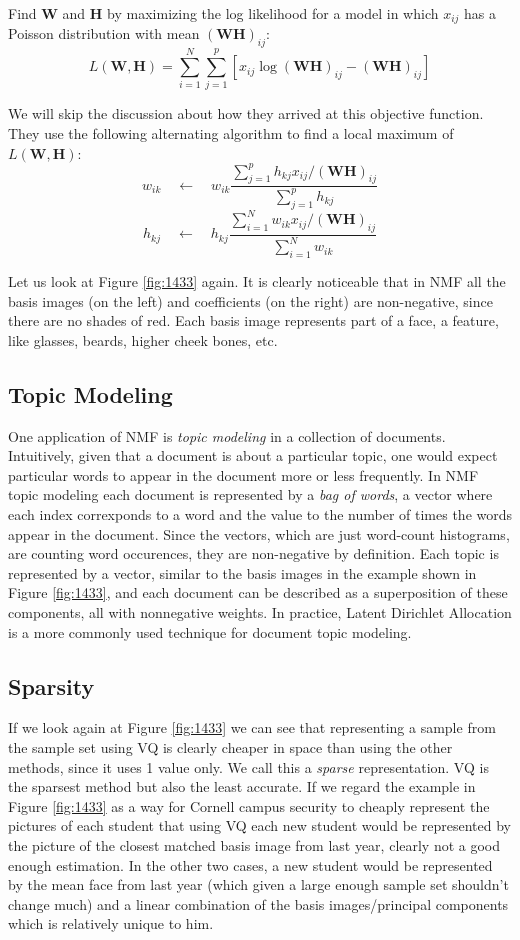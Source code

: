\documentclass[a4paper]{article}
\begin{document}
Find $\mathbf{W}$ and $\mathbf{H}$ by maximizing the log likelihood for a model in which $x_{ij}$ has a Poisson distribution with mean $\left(\mathbf{WH}\right)_{ij}$:
$$L(\mathbf{W},\mathbf{H})=\sum_{i=1}^N \sum_{j=1}^p \left[ x_{ij}\log\left(\mathbf{WH}\right)_{ij}-\left(\mathbf{WH}\right)_{ij}\right]$$

We will skip the discussion about how they arrived at this objective function. They use the following alternating algorithm to find a local maximum of $L(\mathbf{W},\mathbf{H})$:
$$w_{ik} \quad\leftarrow\quad w_{ik} \frac{\sum\limits_{j=1}^p h_{kj}x_{ij}/\left(\mathbf{WH}\right)_{ij}}{\sum\limits_{j=1}^p h_{kj}}$$
$$h_{kj} \quad\leftarrow\quad h_{kj} \frac{\sum\limits_{i=1}^N w_{ik}x_{ij}/\left(\mathbf{WH}\right)_{ij}}{\sum\limits_{i=1}^N w_{ik}}$$

Let us look at Figure \ref{fig:1433} again. It is clearly noticeable that in NMF all the basis images (on the left) and coefficients (on the right) are non-negative, since there are no shades of red. Each basis image represents part of a face, a feature, like glasses, beards, higher cheek bones, etc.\\

\subsection{Topic Modeling}
One application of NMF is \textit{topic modeling} in a collection of documents. Intuitively, given that a document is about a particular topic, one would expect particular words to appear in the document more or less frequently. In NMF topic modeling each document is represented by a \textit{bag of words}, a vector where each index correxponds to a word and the value to the number of times the words appear in the document. Since the vectors, which are just word-count histograms, are counting word occurences, they are non-negative by definition. Each topic is represented by a vector, similar to the basis images in the example shown in Figure \ref{fig:1433}, and each document can be described as a superposition of these components, all with nonnegative weights.  In practice, Latent Dirichlet Allocation is a more commonly used technique for document topic modeling.

\subsection{Sparsity}
If we look again at Figure \ref{fig:1433} we can see that representing a sample from the sample set using VQ is clearly cheaper in space than using the other methods, since it uses 1 value only. We call this a \textit{sparse} representation. VQ is the sparsest method but also the least accurate. If we regard the example in Figure \ref{fig:1433} as a way for Cornell campus security to cheaply represent the pictures of each student that using VQ each new student would be represented by the picture of the closest matched basis image from last year, clearly not a good enough estimation. In the other two cases, a new student would be represented by the mean face from last year (which given a large enough sample set shouldn't change much) and a linear combination of the basis images/principal components which is relatively unique to him.
\end{document}
